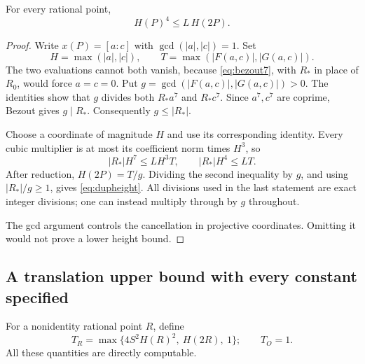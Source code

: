 \begin{lemma}\label{lem:dup-height}
For every rational point,
\[
                  H(P)^4\le L\,H(2P).
 \tag{4.17}\label{eq:dupheight}
\]
\end{lemma}
\begin{proof}
Write $x(P)=[a:c]$ with $\gcd(|a|,|c|)=1$. Set
\[
 H=\max(|a|,|c|),\qquad T=\max(|F(a,c)|,|G(a,c)|).
\]
The two evaluations cannot both vanish, because
\eqref{eq:bezout7}, with $R_*$ in place of $R_0$, would force
$a=c=0$. Put $g=\gcd(|F(a,c)|,|G(a,c)|)>0$.
The identities show that $g$ divides both $R_*a^7$ and $R_*c^7$.
Since $a^7,c^7$ are coprime, Bezout gives $g\mid R_*$.
Consequently $g\le|R_*|$.

Choose a coordinate of magnitude $H$ and use its corresponding identity.
Every cubic multiplier is at most its coefficient norm times $H^3$,
so
\[
 |R_*|H^7\le L H^3T,\qquad |R_*|H^4\le LT.
 \tag{4.18}
\]
After reduction, $H(2P)=T/g$. Dividing the second inequality by
$g$, and using $|R_*|/g\ge1$, gives \eqref{eq:dupheight}.
All divisions used in the last statement are exact integer divisions;
one can instead multiply through by $g$ throughout.

The gcd argument controls the cancellation in projective coordinates.
Omitting it would not prove a lower height bound.
\end{proof}

\subsection{A translation upper bound with every constant specified}
\label{subsec:translation}

For a nonidentity rational point $R$, define
\[
 T_R=\max\{4S^2H(R)^2,\ H(2R),\ 1\};
 \qquad T_O=1.
 \tag{4.19}\label{eq:TR}
\]
All these quantities are directly computable.


